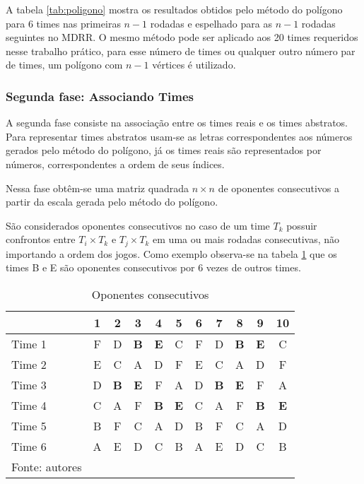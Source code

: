 \documentclass[12pt,a4paper]{article}
\begin{document}
A tabela \ref{tab:poligono} mostra os resultados obtidos pelo método do polígono para $6$ times nas primeiras $n-1$ rodadas e espelhado para as $n-1$ rodadas seguintes no MDRR. O mesmo método pode ser aplicado aos 20 times requeridos nesse trabalho prático, para esse número de times ou qualquer outro número par de times, um polígono com $n-1$ vértices é utilizado.

\subsubsection{Segunda fase: Associando Times}

A segunda fase consiste na associação entre os times reais e os times abstratos. Para representar times abstratos usam-se as letras correspondentes aos números gerados pelo método do polígono, já os times reais são representados por números, correspondentes a ordem de seus índices.

Nessa fase obtêm-se uma matriz quadrada $n \times n$ de oponentes consecutivos a partir da escala gerada pelo método do polígono.

São considerados oponentes consecutivos no caso de um time $T_{k}$ possuir confrontos entre $T_{i} \times T_{k}$ e $T_{j} \times T_{k}$ em uma ou mais rodadas consecutivas, não importando a ordem dos jogos. Como exemplo observa-se na tabela \ref{tab:consecutivos} que os times B e E são oponentes consecutivos por 6 vezes de outros times.

\begin{table}[H]
	\centering
	\caption{Oponentes consecutivos}
	\label{tab:consecutivos}
	\begin{tabular}{l*{10}{c}}
		\toprule
		& 1 & 2 & 3 & 4 & 5 & 6 & 7 & 8 & 9 & 10 \\
		\midrule
		Time 1 & F & D & \textbf{B} & \textbf{E} & C & F & D & \textbf{B} & \textbf{E} & C \\
		Time 2 & E & C & A & D & F & E & C & A & D & F \\
		Time 3 & D & \textbf{B} & \textbf{E} & F & A & D & \textbf{B} & \textbf{E} & F & A \\
		Time 4 & C & A & F & \textbf{B} & \textbf{E} & C & A & F & \textbf{B} & \textbf{E} \\
		Time 5 & B & F & C & A & D & B & F & C & A & D \\
		Time 6 & A & E & D & C & B & A & E & D & C & B \\
		\bottomrule
		\footnotesize Fonte: autores
	\end{tabular}
\end{table}
\end{document}
